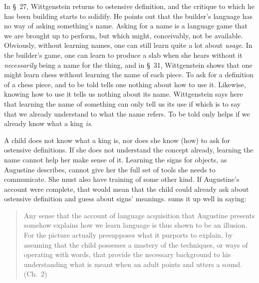 \documentclass[doc,12pt,apacite,biblatex]{apa6}
\begin{document}
In \S~27, Wittgenstein returns to ostensive definition, and the critique to
which he has been building starts to solidify. He points out that the builder's
language has no way of asking something's name. Asking for a name is a language
game that we are brought up to perform, but which might, conceivably, not be
available. Obviously, without learning names, one can still learn quite a lot
about \emph{usage}. In the builder's game, one can learn to produce a slab when
she hears  without it \emph{necessarily} being a name for the thing,
and in \S~31, Wittgenstein shows that one might learn chess without learning
the name of each piece. To ask for a definition of a chess piece, and to be
told  tells one nothing about how to use it. Likewise,
knowing how to use it tells us nothing about its name. Wittgenstein says here
that learning the name of something can only tell us its use if  which is to say that we already understand to what
the name refers. To be told  only helps if we already
know what a king \emph{is}.

A child does not know what a king is, nor does she know (how) to ask for
ostensive definitions. If she does not understand the concept already, learning
the name cannot help her make sense of it. Learning the signs for objects, as
Augustine describes, cannot give her the full set of tools she needs to
communicate. She must also have training of some other kind. If Augustine's
account were complete, that would mean that the child could already ask about
ostensive definition and guess about signs' meanings.  sums it
up well in saying:
\begin{quote}
	Any sense that the account of language acquisition that
Augustine presents somehow explains how we learn language is thus shown to be
an illusion. For the picture actually presupposes what it purports to explain,
by assuming that the child possesses a mastery of the techniques, or ways of
operating with words, that provide the necessary background to his
understanding what is meant when an adult points and utters a sound. (Ch.~2)
\end{quote}
\end{document}
